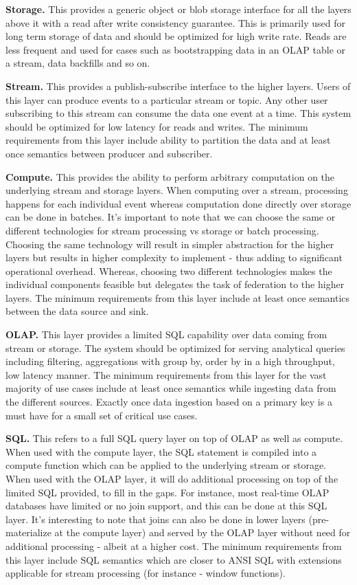 \documentclass[sigconf]{acmart}
\begin{document}
{\bfseries Storage.} This provides a generic object or blob storage interface for all the layers above it with a read after write consistency guarantee. This is primarily used for long term storage of data and should be optimized for high write rate. Reads are less frequent and used for cases such as bootstrapping data in an OLAP table or a stream, data backfills and so on.

{\bfseries Stream.} This provides a publish-subscribe interface to the higher layers. Users of this layer can produce events to a particular stream or topic. Any other user subscribing to this stream can consume the data one event at a time. This system should be optimized for low latency for reads and writes. The minimum requirements from this layer include ability to partition the data and at least once semantics between producer and subscriber.

{\bfseries Compute.} This provides the ability to perform arbitrary computation on the underlying stream and storage layers. When computing over a stream, processing happens for each individual event whereas computation done directly over storage can be done in batches. It’s important to note that we can choose the same or different technologies for stream processing vs storage or batch processing. Choosing the same technology will result in simpler abstraction for the higher layers but results in higher complexity to implement - thus adding to significant operational overhead. Whereas, choosing two different technologies makes the individual components feasible but delegates the task of federation to the higher layers. The minimum requirements from this layer include at least once semantics between the data source and sink.

{\bfseries OLAP.} This layer provides a limited SQL capability over data coming from stream or storage. The system should be optimized for serving analytical queries including filtering, aggregations with group by, order by in a high throughput, low latency manner. The minimum requirements from this layer for the vast majority of use cases include at least once semantics while ingesting data from the different sources. Exactly once data ingestion based on a primary key is a must have for a small set of critical use cases. 

{\bfseries SQL.} This refers to a full SQL query layer on top of OLAP as well as compute. When used with the compute layer, the SQL statement is compiled into a compute function which can be applied to the underlying stream or storage. When used with the OLAP layer, it will do additional processing on top of the limited SQL provided, to fill in the gaps. For instance, most real-time OLAP databases have limited or no join support, and this can be done at this SQL layer. It’s interesting to note that joins can also be done in lower layers (pre-materialize at the compute layer) and served by the OLAP layer without need for additional processing - albeit at a higher cost. The minimum requirements from this layer include SQL semantics which are closer to ANSI SQL with extensions applicable for stream processing (for instance - window functions).
\end{document}
